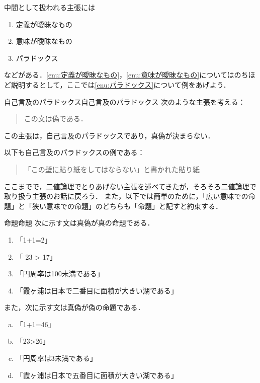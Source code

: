 \documentclass[a4paper,11pt]{ltjsarticle}
\begin{document}
中間として扱われる主張には
\begin{enumerate}[(1)]
  \item 定義が曖昧なもの \label{enu:定義が曖昧なもの}
  \item 意味が曖昧なもの \label{enu:意味が曖昧なもの}
  \item パラドックス \label{enu:パラドックス}
\end{enumerate}
などがある．\ref{enu:定義が曖昧なもの}，\ref{enu:意味が曖昧なもの}についてはのちほど説明するとして，ここでは\ref{enu:パラドックス}について例をあげよう．

\begin{example}{自己言及のパラドックス}{自己言及のパラドックス}
  次のような主張を考える：
  \begin{quote}
    この文は偽である．
  \end{quote}
  この主張は，自己言及のパラドックスであり，真偽が決まらない．

  以下も自己言及のパラドックスの例である：
  \begin{quote}
    「この壁に貼り紙をしてはならない」と書かれた貼り紙
  \end{quote}
\end{example}

ここまでで，二値論理でとりあげない主張を述べてきたが，そろそろ二値論理で取り扱う主張のお話に戻ろう．
また，以下では簡単のために，「広い意味での命題」と「狭い意味での命題」のどちらも「命題」と記すと約束する．

\begin{example}{命題}{命題}
  次に示す文は真偽が真の命題である．
  \begin{enumerate}[(1)]
    \item 「1+1=2」
    \item 「 23 > 17」
    \item 「円周率は100未満である」
    \item 「霞ヶ浦は日本で二番目に面積が大きい湖である」
  \end{enumerate}
  また，次に示す文は真偽が偽の命題である．
  \begin{enumerate}[(a)]
    \item 「1+1=46」
    \item 「23>26」
    \item 「円周率は3未満である」
    \item 「霞ヶ浦は日本で五番目に面積が大きい湖である」
  \end{enumerate}
\end{example}
\end{document}
